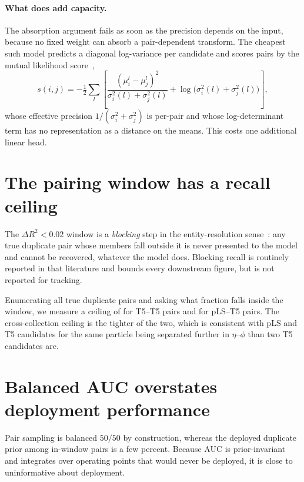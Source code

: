 \documentclass[11pt]{article}
\newcommand{\dRsq}{\Delta R^2}
\begin{document}
\paragraph{What does add capacity.} The absorption argument fails as soon as the
precision depends on the input, because no fixed weight can absorb a
pair-dependent transform. The cheapest such model predicts a diagonal
log-variance per candidate and scores pairs by the mutual likelihood
score~\cite{pfe},
\begin{equation}
s(i,j) = -\tfrac{1}{2}\sum_l \left[
\frac{(\mu_i^l - \mu_j^l)^2}{\sigma_i^2(l)+\sigma_j^2(l)}
+ \log\big(\sigma_i^2(l)+\sigma_j^2(l)\big)\right],
\end{equation}
whose effective precision $1/(\sigma_i^2+\sigma_j^2)$ is per-pair and whose
log-determinant term has no representation as a distance on the means. This costs
one additional linear head.

\section{The pairing window has a recall ceiling}
\label{sec:ceiling}

The $\dRsq<0.02$ window is a \emph{blocking} step in the entity-resolution
sense~\cite{deepblocker}: any true duplicate pair whose members fall outside it is
never presented to the model and cannot be recovered, whatever the model does.
Blocking recall is routinely reported in that literature and bounds every
downstream figure, but is not reported for tracking.

Enumerating all true duplicate pairs and asking what fraction falls inside the
window, we measure a ceiling of \CeilingTfive{} for T5--T5 pairs and
\CeilingCross{} for pLS--T5 pairs. The cross-collection ceiling is the tighter of
the two, which is consistent with pLS and T5 candidates for the same particle
being separated further in $\eta$--$\phi$ than two T5 candidates are.

\section{Balanced AUC overstates deployment performance}
\label{sec:operating}

Pair sampling is balanced $50/50$ by construction, whereas the deployed duplicate
prior among in-window pairs is a few percent. Because AUC is prior-invariant and
integrates over operating points that would never be deployed, it is close to
uninformative about deployment.
\end{document}
